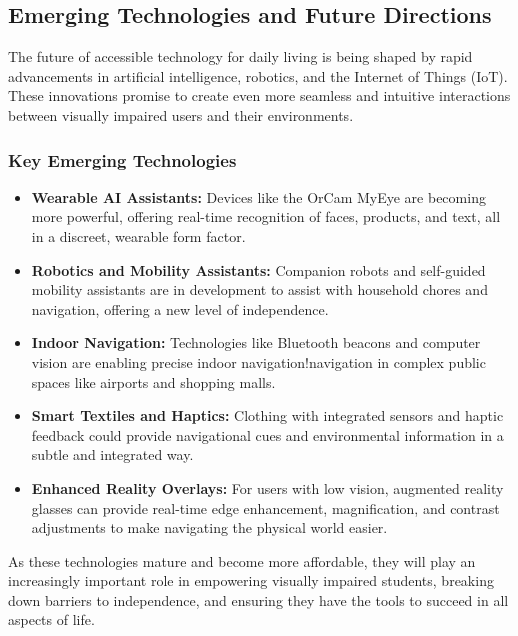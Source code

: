 \subsection{Emerging Technologies and Future Directions}

The future of accessible technology for daily living is being shaped by rapid advancements in artificial intelligence, robotics, and the Internet of Things (IoT). These innovations promise to create even more seamless and intuitive interactions between visually impaired users and their environments.

\subsubsection{Key Emerging Technologies}
\begin{itemize}
	\item \textbf{Wearable AI Assistants:} Devices like the OrCam MyEye are becoming more powerful, offering real-time recognition of faces, products, and text, all in a discreet, wearable form factor.
	\item \textbf{Robotics and Mobility Assistants:} Companion robots and self-guided mobility assistants are in development to assist with household chores and navigation, offering a new level of independence.
	\item \textbf{Indoor Navigation:} Technologies like Bluetooth beacons and computer vision are enabling precise indoor navigation!navigation in complex public spaces like airports and shopping malls.
	\item \textbf{Smart Textiles and Haptics:} Clothing with integrated sensors and haptic feedback could provide navigational cues and environmental information in a subtle and integrated way.
	\item \textbf{Enhanced Reality Overlays:} For users with low vision, augmented reality glasses can provide real-time edge enhancement, magnification, and contrast adjustments to make navigating the physical world easier.
\end{itemize}
As these technologies mature and become more affordable, they will play an increasingly important role in empowering visually impaired students, breaking down barriers to independence, and ensuring they have the tools to succeed in all aspects of life.
